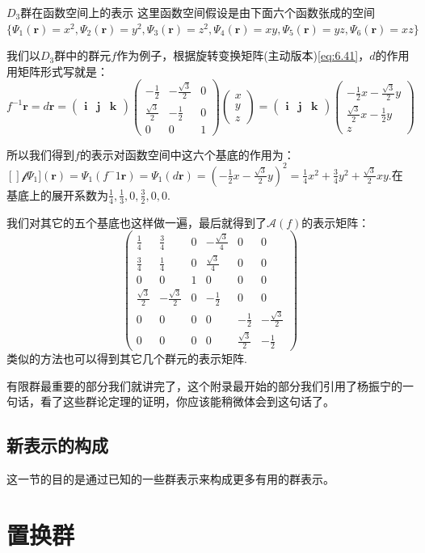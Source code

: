 \begin{example}{$D_3$群在函数空间上的表示}
	这里函数空间假设是由下面六个函数张成的空间$\{\Psi_1(\mathbf{r})=x^2,\Psi_2(\mathbf{r})=y^2,\Psi_3(\mathbf{r})=z^2,\Psi_4(\mathbf{r})=xy,\Psi_5(\mathbf{r})=yz,\Psi_6(\mathbf{r})=xz\}$
	
	我们以$D_3$群中的群元$f$作为例子，根据旋转变换矩阵(主动版本)\ref{eq:6.41}，$d$的作用用矩阵形式写就是：
	\begin{equation*}
			f^{-1}\mathbf{r}=d\mathbf{r}=\begin{pmatrix}
			\mathbf{i} &\mathbf{j}  &\mathbf{k} 
		\end{pmatrix}
		\begin{pmatrix}
			-\frac{1}{2}& -\frac{\sqrt{3}}{2} & 0\\
			\frac{\sqrt{3}}{2} &   -\frac{1}{2} & 0\\
			0 &  0&1
		\end{pmatrix}
		\begin{pmatrix}
			x\\
			y\\
			z
		\end{pmatrix}=
		\begin{pmatrix}
			\mathbf{i} &\mathbf{j}  &\mathbf{k} 
		\end{pmatrix}
		\begin{pmatrix}
			-\frac{1}{2}x-\frac{\sqrt{3}}{2}y  \\
			\frac{\sqrt{3}}{2}x-\frac{1}{2}y  \\
			z
		\end{pmatrix}
	\end{equation*}

\setlength\parindent{2em}所以我们得到$f$的表示对函数空间中这六个基底的作用为：$[]\mathscr{f}\Psi_1](\mathbf{r})=\Psi_1(f^-1\mathbf{r})=\Psi_1(d\mathbf{r})=\left(-\frac{1}{2}x-\frac{\sqrt{3}}{2}y\right)^2=\frac{1}{4}x^2+\frac{3}{4}y^2+\frac{\sqrt{3}}{2}xy$.在基底上的展开系数为$\frac{1}{4},\frac{1}{3},0,\frac{3}{2},0,0$.

我们对其它的五个基底也这样做一遍，最后就得到了$\mathscr{A}(f)$的表示矩阵：
\[\left( {\begin{array}{*{20}{c}}
		{\frac{1}{4}}&{\frac{3}{4}}&0&{ - \frac{{\sqrt 3 }}{4}}&0&0 \\ 
		{\frac{3}{4}}&{\frac{1}{4}}&0&{\frac{{\sqrt 3 }}{4}}&0&0 \\ 
		0&0&1&0&0&0 \\ 
		{\frac{{\sqrt 3 }}{2}}&{ - \frac{{\sqrt 3 }}{2}}&0&{ - \frac{1}{2}}&0&0 \\ 
		0&0&0&0&{ - \frac{1}{2}}&{ - \frac{{\sqrt 3 }}{2}} \\ 
		0&0&0&0&{\frac{{\sqrt 3 }}{2}}&{ - \frac{1}{2}} 
\end{array}} \right)\]
类似的方法也可以得到其它几个群元的表示矩阵.
\end{example}

有限群最重要的部分我们就讲完了，这个附录最开始的部分我们引用了杨振宁的一句话，看了这些群论定理的证明，你应该能稍微体会到这句话了。

\subsection{新表示的构成}
这一节的目的是通过已知的一些群表示来构成更多有用的群表示。
\section{置换群}